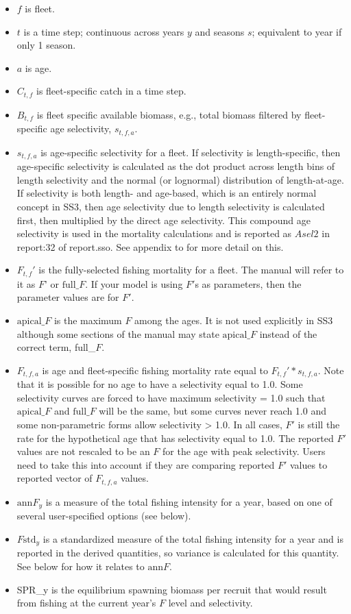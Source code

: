 \begin{itemize}
	\item $f$ is fleet.
	\item $t$ is a time step; continuous across years $y$ and seasons $s$; equivalent to year if only 1 season.
	\item $a$ is age.
	\item $C_{t,f}$ is fleet-specific catch in a time step.
	\item $B_{t,f}$ is fleet specific available biomass, e.g., total biomass filtered by fleet-specific age selectivity, $s_{t,f,a}$.
	\item $s_{t,f,a}$ is age-specific selectivity for a fleet. If selectivity is length-specific, then age-specific selectivity is calculated as the dot product across length bins of length selectivity and the normal (or lognormal) distribution of length-at-age. If selectivity is both length- and age-based, which is an entirely normal concept in SS3, then age selectivity due to length selectivity is calculated first, then multiplied by the direct age selectivity. This compound age selectivity is used in the mortality calculations and is reported as $Asel2$ in report:32 of report.sso. See appendix to \citet{methotstock2013} for more detail on this.
	\item $F_{t,f}'$ is the fully-selected fishing mortality for a fleet. The manual will refer to it as $F’$ or $\text{full\_}F$. If your model is using $F'$s as parameters, then the parameter values are for $F'$.
	\item $\text{apical\_}F$ is the maximum $F$ among the ages. It is not used explicitly in SS3 although some sections of the manual may state $\text{apical\_}F$ instead of the correct term, full\_$F$.
	\item $F_{t,f,a}$ is age and fleet-specific fishing mortality rate equal to $F_{t,f}' * s_{t,f,a}$. Note that it is possible for no age to have a selectivity equal to 1.0. Some selectivity curves are forced to have maximum selectivity = 1.0 such that $\text{apical\_}F$ and $\text{full\_}F$ will be the same, but some curves never reach 1.0 and some non-parametric forms allow selectivity > 1.0. In all cases, $F'$ is still the rate for the hypothetical age that has selectivity equal to 1.0. The reported $F'$ values are not rescaled to be an $F$ for the age with peak selectivity. Users need to take this into account if they are comparing reported $F'$ values to reported vector of $F_{t,f,a}$ values.
	\item $\text{ann}F_y$ is a measure of the total fishing intensity for a year, based on one of several user-specified options (see below).
	\item $F\text{std}_y$ is a standardized measure of the total fishing intensity for a year and is reported in the derived quantities, so variance is calculated for this quantity. See below for how it relates to $\text{ann}F$.
	\item SPR\_y is the equilibrium spawning biomass per recruit that would result from fishing at the current year’s $F$ level and selectivity.
\end{itemize}

